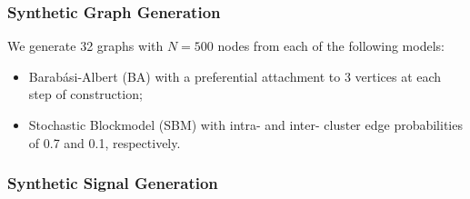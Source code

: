 \subsubsection{Synthetic Graph Generation}
We generate 32 graphs with $N=500$ nodes from each of the following models:
\begin{itemize}
    \item Barab\'asi-Albert (BA) with a preferential attachment to 3 vertices at each step of construction;
    \item Stochastic Blockmodel (SBM) with intra- and inter- cluster edge probabilities of 0.7 and 0.1, respectively.
\end{itemize}

\subsubsection{Synthetic Signal Generation}

